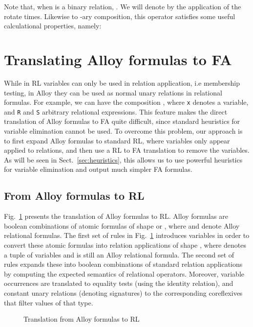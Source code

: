 \documentclass{llncs}
\begin{document}
Note that, when  is a binary relation, . We will denote by  the application of the rotate  times. Likewise to -ary composition, this operator satisfies some useful calculational properties, namely:


\section{Translating Alloy formulas to FA}
\label{sec:alloyforms}

While in RL variables can only be used in relation application, i.e
membership testing, in Alloy they can be used as normal unary
relations in relational formulas. For example, we can have the
composition , where \texttt{x} denotes a variable,
and \texttt{R} and \texttt{S} arbitrary relational expressions. This
feature makes the direct translation of Alloy formulas to FA quite
difficult, since standard heuristics for variable elimination cannot
be used. 
To overcome this problem, our approach is to first expand Alloy
formulas to standard RL, where variables only appear applied to
relations, and then use a RL to FA translation to remove the
variables. As will be seen in Sect.~\ref{sec:heuristics}, this allows
us to use powerful heuristics for variable elimination and output much
simpler FA formulas.

\subsection{From Alloy formulas to RL}
\label{sec:tralloy}

Fig.~\ref{fig:alloy2rl} presents the translation of Alloy formulas to
RL. Alloy formulas are boolean combinations of atomic formulas of
shape  or , where
 and  denote Alloy relational formulas. The
first set of rules in Fig.~\ref{fig:alloy2rl} introduces variables in
order to convert these atomic formulas into relation applications of
shape , where  denotes a tuple of variables and
 is still an Alloy relational formula. The second set of
rules expands these into boolean combinations of standard relation
applications by computing the expected semantics of relational
operators. Moreover, variable occurrences are translated to equality
tests (using the identity relation), and constant unary relations
(denoting signatures) to the corresponding coreflexives that filter
values of that type.

\begin{figure}[t]
  \centering
  
  \caption{Translation from Alloy formulas to RL}
  \label{fig:alloy2rl}
\end{figure}
\end{document}
